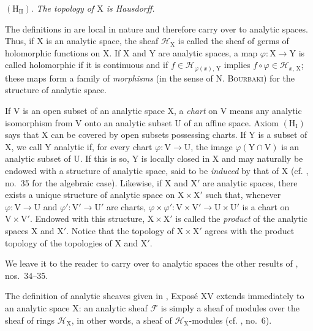 $(\mathrm{H}_{\mathrm{II}})$. \emph{The topology of $\mathrm{X}$ is Hausdorff.}

The definitions in  are local in nature and therefore carry over to analytic spaces. Thus, if $\mathrm{X}$ is an analytic space, the sheaf $\mathcal{H}_{\mathrm{X}}$ is called the sheaf of germs of holomorphic functions on $\mathrm{X}$. If $\mathrm{X}$ and $\mathrm{Y}$ are analytic spaces, a map $\varphi:\mathrm{X}\to\mathrm{Y}$ is called holomorphic if it is continuous and if $f\in\mathcal{H}_{\varphi(x),\,\mathrm{Y}}$ implies $f\circ\varphi\in\mathcal{H}_{x,\,\mathrm{X}}$; these maps form a family of \emph{morphisms} (in the sense of N. \textsc{Bourbaki}) for the structure of analytic space.

If $\mathrm{V}$ is an open subset of an analytic space $\mathrm{X}$, a \emph{chart} on $\mathrm{V}$ means any analytic isomorphism from $\mathrm{V}$ onto an analytic subset $\mathrm{U}$ of an affine space. Axiom $(\mathrm{H}_{\mathrm{I}})$ says that $\mathrm{X}$ can be covered by open subsets possessing charts. If $\mathrm{Y}$ is a subset of $\mathrm{X}$, we call $\mathrm{Y}$ analytic if, for every chart $\varphi:\mathrm{V}\to\mathrm{U}$, the image $\varphi(\mathrm{Y}\cap\mathrm{V})$ is an analytic subset of $\mathrm{U}$. If this is so, $\mathrm{Y}$ is locally closed in $\mathrm{X}$ and may naturally be endowed with a structure of analytic space, said to be \emph{induced} by that of $\mathrm{X}$ (cf. , no.~35 for the algebraic case). Likewise, if $\mathrm{X}$ and $\mathrm{X}'$ are analytic spaces, there exists a unique structure of analytic space on $\mathrm{X}\times\mathrm{X}'$ such that, whenever $\varphi:\mathrm{V}\to\mathrm{U}$ and $\varphi':\mathrm{V}'\to\mathrm{U}'$ are charts, $\varphi\times\varphi':\mathrm{V}\times\mathrm{V}'\to\mathrm{U}\times\mathrm{U}'$ is a chart on $\mathrm{V}\times\mathrm{V}'$. Endowed with this structure, $\mathrm{X}\times\mathrm{X}'$ is called the \emph{product} of the analytic spaces $\mathrm{X}$ and $\mathrm{X}'$. Notice that the topology of $\mathrm{X}\times\mathrm{X}'$ agrees with the product topology of the topologies of $\mathrm{X}$ and $\mathrm{X}'$.

We leave it to the reader to carry over to analytic spaces the other results of , nos.~34--35.


The definition of analytic sheaves given in , Expos\'e XV extends immediately to an analytic space $\mathrm{X}$: an analytic sheaf $\mathcal{F}$ is simply a sheaf of modules over the sheaf of rings $\mathcal{H}_{\mathrm{X}}$, in other words, a sheaf of $\mathcal{H}_{\mathrm{X}}$-modules (cf. , no.~6).

